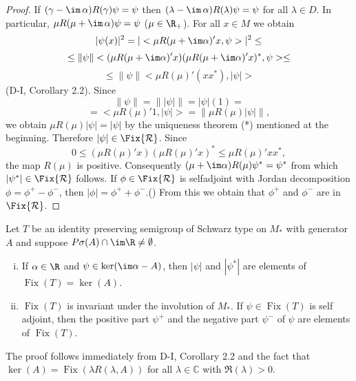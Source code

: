 
\begin{proof}
If $(\gamma - \im\,\alpha)R(\gamma)\psi = \psi$ then $(\lambda - \im\,\alpha)R(\lambda)\psi = \psi$ for all $\lambda \in D$.
In particular, $\mu R(\mu + \im\,\alpha)\psi = \psi$ ($\mu \in \R_+$).
For all $x \in M$ we obtain
\[
|\psi(x)|^2 = |<\mu R(\mu+\im\alpha)'x,\psi>|^2 \leq
\]
\[
\leq \|\psi\| <(\mu R(\mu+\im\alpha)'x)(\mu R(\mu+\im\alpha)'x)^{*},\psi> \leq
\]
\[
\leq \|\psi\| <\mu R(\mu)'(xx^{*}),|\psi|>
\]
(D-I, Corollary 2.2).
Since
\[
\|\psi\| = \| |\psi| \| = |\psi|(1) =
\]
\[
= <\mu R(\mu)'1,|\psi|> = \| \mu R(\mu)|\psi| \|,
\]
we obtain $\mu R(\mu)|\psi| = |\psi|$ by the uniqueness theorem (*) mentioned at the beginning.
Therefore $|\psi| \in \Fix{\mathcal{R}} $.
Since
\[
0 \leq (\mu R(\mu)'x)(\mu R(\mu)'x)^{*} \leq \mu R(\mu)'xx^{*},
\]
the map $R(\mu)$ is positive.
Consequently $(\mu+\im\alpha)R(\mu)\psi^{*} = \psi^{*}$ from which $|\psi^{*}| \in \Fix{\mathcal{R}} $ follows.
If $\phi \in \Fix{\mathcal{R}} $ is selfadjoint with Jordan decomposition $\phi = \phi^{+} - \phi^{-}$, then $|\phi| = \phi^{+} + \phi^{-}$.(\citet[Theorem III.4.2.]{takesaki:1979})
From this we obtain that $\phi^{+}$ and $\phi^{-}$ are in $ \Fix{\mathcal{R}} $.
\end{proof}
\begin{corollary}\label{cor:d3-1.5}
Let $T$ be an identity preserving semigroup of Schwarz type on $M_*$ with generator $A$ and suppose $P\sigma(A) \cap \im\R \neq \emptyset$.

\begin{enumerate}[(i)]
\item
If $\alpha \in \R$ and $\psi \in \operatorname{ker}(\im\alpha - A)$, then $|\psi|$ and $|\psi^{*}|$ are elements of $\operatorname{Fix}(T) = \operatorname{ker}(A)$.

\item 
$\operatorname{Fix}(T)$ is invariant under the involution of $M_*$.
If $\psi \in \operatorname{Fix}(T)$ is self adjoint, then the positive part $\psi^{+}$ and the negative part $\psi^{-}$ of $\psi$ are elements of $\operatorname{Fix}(T)$.
\end{enumerate}

\end{corollary}
The proof follows immediately from D-I, Corollary 2.2 and the fact that $\operatorname{ker}(A) = \operatorname{Fix}(\lambda R(\lambda,A))$ for all $\lambda \in \mathbb{C}$ with $\Re(\lambda) > 0$.

